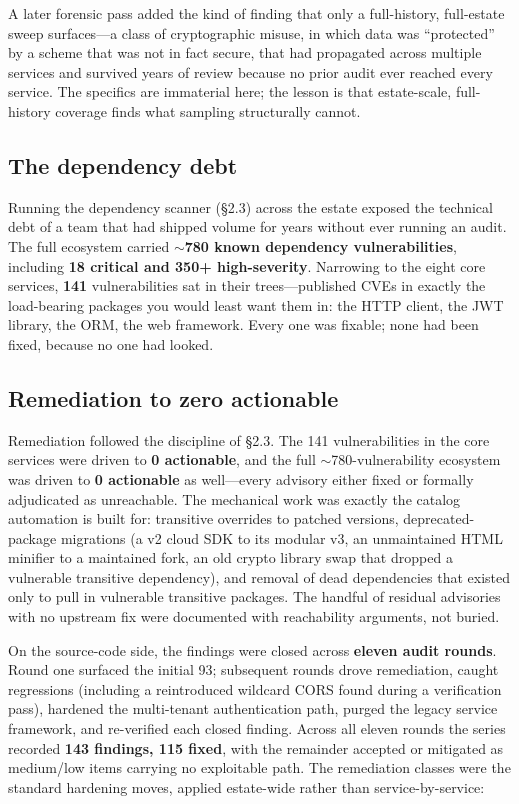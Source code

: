 \documentclass[11pt,letterpaper]{article}
\begin{document}
A later forensic pass added the kind of finding that only a full-history,
full-estate sweep surfaces---a class of cryptographic misuse, in which data was
``protected'' by a scheme that was not in fact secure, that had propagated across
multiple services and survived years of review because no prior audit ever reached
every service. The specifics are immaterial here; the lesson is that estate-scale,
full-history coverage finds what sampling structurally cannot.

\subsection{The dependency debt}

Running the dependency scanner (\S2.3) across the estate exposed the technical
debt of a team that had shipped volume for years without ever running an audit.
The full ecosystem carried \textbf{$\sim$780 known dependency vulnerabilities},
including \textbf{18 critical and 350+ high-severity}. Narrowing to the eight core
services, \textbf{141} vulnerabilities sat in their trees---published CVEs in
exactly the load-bearing packages you would least want them in: the HTTP client,
the JWT library, the ORM, the web framework. Every one was fixable; none had been
fixed, because no one had looked.

\subsection{Remediation to zero actionable}

Remediation followed the discipline of \S2.3. The 141 vulnerabilities in the core
services were driven to \textbf{0 actionable}, and the full $\sim$780-vulnerability
ecosystem was driven to \textbf{0 actionable} as well---every advisory either
fixed or formally adjudicated as unreachable. The mechanical work was exactly the
catalog automation is built for: transitive overrides to patched versions,
deprecated-package migrations (a v2 cloud SDK to its modular v3, an unmaintained
HTML minifier to a maintained fork, an old crypto library swap that dropped a
vulnerable transitive dependency), and removal of dead dependencies that existed
only to pull in vulnerable transitive packages. The handful of residual advisories
with no upstream fix were documented with reachability arguments, not buried.

On the source-code side, the findings were closed across \textbf{eleven audit
rounds}. Round one surfaced the initial 93; subsequent rounds drove remediation,
caught regressions (including a reintroduced wildcard CORS found during a
verification pass), hardened the multi-tenant authentication path, purged the
legacy service framework, and re-verified each closed finding. Across all eleven
rounds the series recorded \textbf{143 findings, 115 fixed}, with the remainder
accepted or mitigated as medium/low items carrying no exploitable path. The
remediation classes were the standard hardening moves, applied estate-wide rather
than service-by-service:
\end{document}
